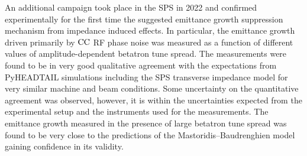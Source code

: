 

An additional campaign took place in the SPS in 2022 and confirmed experimentally for the first time the suggested emittance growth suppression mechanism from impedance induced effects. In particular, the emittance growth driven primarily by ${\mathrm{CC}}$ RF phase noise was measured as a function of different values of amplitude-dependent betatron tune spread. The measurements were found to be in very good qualitative agreement with the expectations from PyHEADTAIL simulations including the SPS transverse impedance model for very similar machine and beam conditions. Some uncertainty on the quantitative agreement was observed, however, it is within the uncertainties expected from the experimental setup and the instruments used for the measurements. The emittance growth measured in the presence of large betatron tune spread was found to be very close to the predictions of the Mastoridis--Baudrenghien model gaining confidence in its validity.



